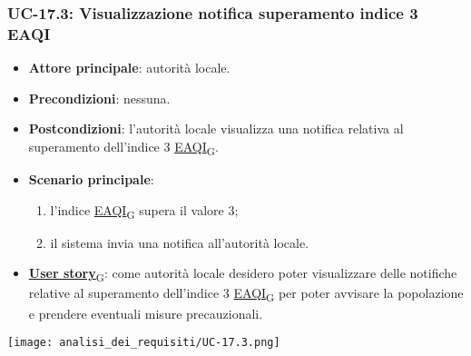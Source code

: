 \subsubsection{UC-17.3: Visualizzazione notifica superamento indice 3 EAQI}
\begin{itemize}
	\item \textbf{Attore principale}: autorità locale.
	\item \textbf{Precondizioni}: nessuna.
	\item \textbf{Postcondizioni}: l'autorità locale visualizza una notifica relativa al superamento dell'indice 3 \href{https://7last.github.io/docs/pb/documentazione-interna/glossario\#european-air-quality-index}{EAQI\textsubscript{G}}.
	\item \textbf{Scenario principale}:
	      \begin{enumerate}
		      \item l'indice \href{https://7last.github.io/docs/pb/documentazione-interna/glossario\#european-air-quality-index}{EAQI\textsubscript{G}} supera il valore 3;
		      \item il sistema invia una notifica all'autorità locale.
	      \end{enumerate}
	\item \href{https://7last.github.io/docs/pb/documentazione-interna/glossario\#user-story}{\textbf{User story}\textsubscript{G}}:
	      come autorità locale desidero poter visualizzare delle notifiche relative al superamento dell'indice 3 \href{https://7last.github.io/docs/pb/documentazione-interna/glossario\#european-air-quality-index}{EAQI\textsubscript{G}}
	      per poter avvisare la popolazione e prendere eventuali misure precauzionali.
\end{itemize}
\begin{center}
	\texttt{[image: analisi\_dei\_requisiti/UC-17.3.png]}
\end{center}

